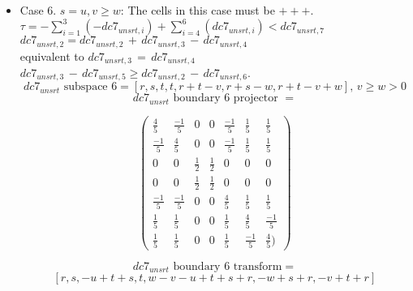 \documentclass[preprint]{iucr}              %
\begin{document}
{ \begin{itemize}
     \item{Case 6. $s=u, v \ge w$:  The cells in this case must be $+++$.\\
     $\tau=-\sum_{i=1}^3(-dc7_{unsrt,i})+\sum_{i=4}^6(dc7_{unsrt,i}) < dc7_{unsrt,7}$\\
     $dc7_{unsrt,2}=dc7_{unsrt,2}\,+\,dc7_{unsrt,3}\,-\,dc7_{unsrt,4}$\\
          equivalent to
     $dc7_{unsrt,3}\,=\,dc7_{unsrt,4}$\\
     $dc7_{unsrt,3}\,-\,dc7_{unsrt,5} \ge
     dc7_{unsrt,2}\,-\,dc7_{unsrt,6}$.
     \[dc7_{unsrt} \text{ subspace 6}=[r,s,t,t,r+t-v,r+s-w, r+t-v+w],\, v \geq w >0 \]
     \[dc7_{unsrt} \text{ boundary 6 projector } =\]
\begin{center}
\begin{equation*}
\begin{pmatrix}
\frac{4}{5}&\frac{-1}{5}&0&0&\frac{-1}{5}&\frac{1}{5}&\frac{1}{5}\\[.25em]
\frac{-1}{5}&\frac{4}{5}&0&0&\frac{-1}{5}&\frac{1}{5}&\frac{1}{5}\\[.25em]
0&0&\frac{1}{2}&\frac{1}{2}&0&0&0\\[.25em]
0&0&\frac{1}{2}&\frac{1}{2}&0&0&0\\[.25em]
\frac{-1}{5}&\frac{-1}{5}&0&0&\frac{4}{5}&\frac{1}{5}&\frac{1}{5}\\[.25em]
\frac{1}{5}&\frac{1}{5}&0&0&\frac{1}{5}&\frac{4}{5}&\frac{-1}{5}\\[.25em]
\frac{1}{5}&\frac{1}{5}&0&0&\frac{1}{5}&\frac{-1}{5}&\frac{4}{5})
\end{pmatrix}
\end{equation*}
\end{center}


    \[dc7_{unsrt} \text{ boundary 6 transform}=\]
    \[ [r,s,-u+t+s,t,w-v-u+t+s+r,-w+s+r,-v+t+r] \]
     }
     

\end{itemize}}
\end{document}
